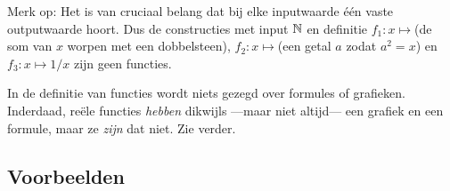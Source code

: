 \documentclass{ximera}
\begin{document}
Merk op:	
 Het is van cruciaal belang dat bij elke inputwaarde één vaste outputwaarde hoort. Dus de constructies met input $\mathbb{N}$ en definitie $f_1: x\mapsto $(de som van $x$ worpen met een dobbelsteen), $f_2: x\mapsto $(een getal $a$ zodat $a^2=x$) en $f_3:x\mapsto 1/x$ zijn geen functies.
 
 In de definitie van functies wordt niets gezegd over formules of grafieken. Inderdaad, reële functies \textit{hebben} dikwijls ---maar niet altijd--- een grafiek en een formule, maar ze \textit{zijn} dat niet. Zie verder.
 
 
\subsection{Voorbeelden}
\end{document}
